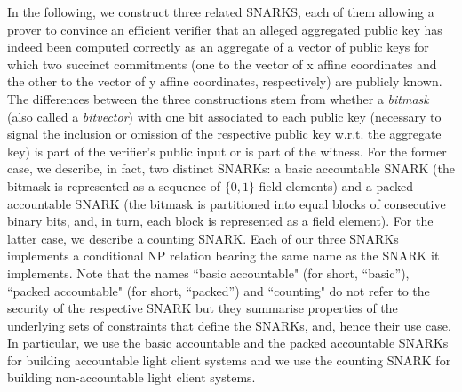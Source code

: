 \label{sec:snarks}

In the following, we construct three related SNARKS, each of them allowing a prover to convince an 
efficient verifier that an alleged aggregated public key has indeed been computed correctly as an aggregate 
of a vector of public keys for which two succinct commitments (one to the vector of x affine coordinates and the other 
to the vector of y affine coordinates, respectively) are publicly known. The differences between the three 
constructions stem from whether a \emph{bitmask} (also called a \emph{bitvector}) with one bit associated to each public key 
(necessary to signal the inclusion or omission of the respective public key w.r.t. the aggregate key) 
is part of the verifier's public input or is part of the witness. For the former case, we describe, in fact, two distinct SNARKs: a 
basic accountable SNARK (the bitmask is represented as a sequence of $\{0,1\}$ field elements) and a packed accountable SNARK (the bitmask is 
partitioned into equal blocks of consecutive binary bits, and, in turn, each block is represented as a field element). For the latter case, 
we describe a counting SNARK. Each of our three SNARKs implements a conditional NP relation bearing the 
same name as the SNARK it implements. Note that the names ``basic accountable" (for short, ``basic''), ``packed accountable" (for short, ``packed'') and ``counting" do 
not refer to the security of the respective SNARK but they summarise properties of the underlying sets of constraints that define 
the SNARKs, and, hence their use case. In particular, we use the basic accountable and the packed accountable SNARKs for building 
accountable light client systems and we use the counting SNARK for building non-accountable light client systems.\\

